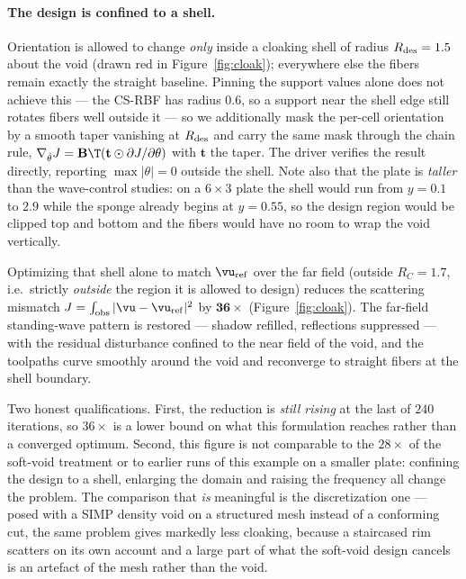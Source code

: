 \documentclass[11pt]{article}
\begin{document}
\paragraph{The design is confined to a shell.} Orientation is allowed to change
\emph{only} inside a cloaking shell of radius $R_{\rm des}=1.5$ about the void
(drawn red in Figure~\ref{fig:cloak}); everywhere else the fibers remain exactly
the straight baseline. Pinning the support values alone does not achieve this ---
the CS-RBF has radius $0.6$, so a support near the shell edge still rotates fibers
well outside it --- so we additionally mask the per-cell orientation by a smooth
taper vanishing at $R_{\rm des}$ and carry the same mask through the chain rule,
$\nabla_{\hat\theta}J=\mathbf B\T(\mathbf t\odot\partial J/\partial\theta)$ with
$\mathbf t$ the taper. The driver verifies the result directly, reporting
$\max|\theta|=0$ outside the shell. Note also that the plate is
\emph{taller} than the wave-control studies: on a $6\times3$ plate the shell would
run from $y=0.1$ to $2.9$ while the sponge already begins at $y=0.55$, so the
design region would be clipped top and bottom and the fibers would have no room to
wrap the void vertically.

Optimizing that shell alone to match $\vu_{\rm ref}$ over the far field (outside
$R_C=1.7$, i.e.\ strictly \emph{outside} the region it is allowed to design)
reduces the scattering mismatch $J=\int_{\rm obs}|\vu-\vu_{\rm ref}|^2$ by
$\mathbf{36\times}$ (Figure~\ref{fig:cloak}). The far-field standing-wave pattern
is restored --- shadow refilled, reflections suppressed --- with the residual
disturbance confined to the near field of the void, and the toolpaths curve
smoothly around the void and reconverge to straight fibers at the shell boundary.

Two honest qualifications. First, the reduction is \emph{still rising} at the last
of $240$ iterations, so $36\times$ is a lower bound on what this formulation
reaches rather than a converged optimum. Second, this figure is not comparable to
the $28\times$ of the soft-void treatment or to earlier runs of this example on a
smaller plate: confining the design to a shell, enlarging the domain and raising
the frequency all change the problem. The comparison that \emph{is} meaningful is
the discretization one --- posed with a SIMP density void on a structured mesh
instead of a conforming cut, the same problem gives markedly less cloaking,
because a staircased rim scatters on its own account and a large part of what the
soft-void design cancels is an artefact of the mesh rather than the void.
\end{document}
